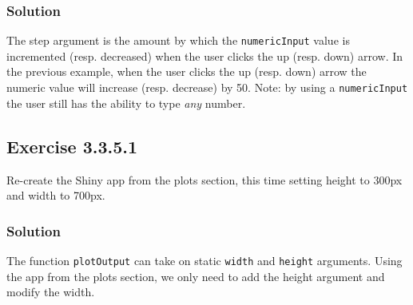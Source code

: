 \documentclass[]{book}
\newenvironment{Shaded}{\begin{snugshade}}{\end{snugshade}}
\newcommand{\ControlFlowTok}[1]{\textcolor[rgb]{0.13,0.29,0.53}{\textbf{#1}}}
\newcommand{\DataTypeTok}[1]{\textcolor[rgb]{0.13,0.29,0.53}{#1}}
\newcommand{\DecValTok}[1]{\textcolor[rgb]{0.00,0.00,0.81}{#1}}
\newcommand{\KeywordTok}[1]{\textcolor[rgb]{0.13,0.29,0.53}{\textbf{#1}}}
\newcommand{\NormalTok}[1]{#1}
\newcommand{\OperatorTok}[1]{\textcolor[rgb]{0.81,0.36,0.00}{\textbf{#1}}}
\newcommand{\StringTok}[1]{\textcolor[rgb]{0.31,0.60,0.02}{#1}}
\begin{document}
\begin{solution}

\hypertarget{solution-4}{%
\subsubsection*{Solution}\label{solution-4}}

The step argument is the amount by which the \texttt{numericInput} value is
incremented (resp. decreased) when the user clicks the up (resp. down) arrow.
In the previous example, when the user clicks the up (resp. down) arrow the
numeric value will increase (resp. decrease) by 50. Note: by using a
\texttt{numericInput} the user still has the ability to type \emph{any} number.

\end{solution}

\hypertarget{exercise-3.3.5.1}{%
\subsection*{Exercise 3.3.5.1}\label{exercise-3.3.5.1}}

Re-create the Shiny app from the plots section, this time setting height to
300px and width to 700px.

\begin{solution}

\hypertarget{solution-5}{%
\subsubsection*{Solution}\label{solution-5}}

The function \texttt{plotOutput} can take on static \texttt{width} and \texttt{height} arguments.
Using the app from the plots section, we only need to add the height argument
and modify the width.

\begin{Shaded}
\end{Shaded}

\end{solution}
\end{document}

